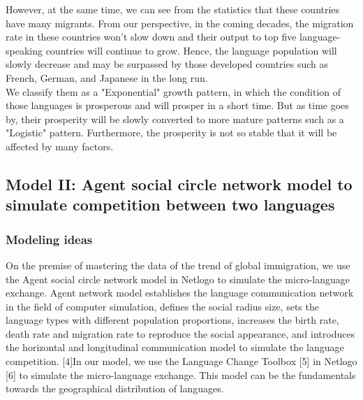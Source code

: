 \documentclass{mcmthesis}
\begin{document}
\hspace*{8mm}However, at the same time, we can see from the statistics that these countries have many migrants. From our perspective, in the coming decades, the migration rate in these countries won't slow down and their output to top five language-speaking countries will continue to grow. Hence, the language population will slowly decrease and may be surpassed by those developed countries such as French, German, and Japanese in the long run.\\
\hspace*{8mm}We classify them as a "Exponential" growth pattern, in which the condition of those languages is prosperous and will prosper in a short time. But as time goes by, their prosperity will be slowly converted to more mature patterns such as a "Logistic" pattern. Furthermore, the prosperity is not so stable that it will be affected by many factors.\\

\subsection{Model II: Agent social circle network model to simulate competition between two languages}

\subsubsection{Modeling ideas}
\hspace*{8mm}On the premise of mastering the data of the trend of global immigration, we use the Agent social circle network model in Netlogo to simulate the micro-language exchange. Agent network model establishes the language communication network in the field of computer simulation, defines the social radius size, sets the language types with different population proportions, increases the birth rate, death rate and migration rate to reproduce the social appearance, and introduces the horizontal and longitudinal communication model to simulate the language competition. [4]In our model, we use the Language Change Toolbox [5] in Netlogo [6] to simulate the micro-language exchange. This model can be the fundamentals towards the geographical distribution of languages.
\end{document}
